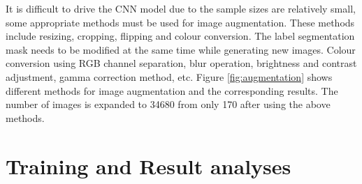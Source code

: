 \documentclass[12pt, a4paper]{article}
\begin{document}
	\par
	It is difficult to drive the CNN model due to the sample sizes are relatively small, some appropriate methods must be used for image augmentation. These methods include resizing, cropping, flipping and colour conversion. The label segmentation mask needs to be modified at the same time while generating new images. Colour conversion using RGB channel separation, blur operation, brightness and contrast adjustment, gamma correction method, etc. Figure \ref{fig:augmentation} shows different methods for image augmentation and the corresponding results. The number of images is expanded to 34680 from only 170 after using the above methods.

	\section{Training and Result analyses } \justify
	
\end{document}
